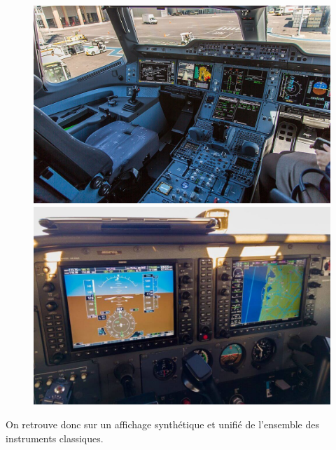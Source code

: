 	\begin{figure}[H]
	\begin{minipage}[c]{0.5\linewidth}
	\includegraphics[width=\linewidth]{01-EtudeAeronefs/img/A350Cockpit.jpg}
	\end{minipage}
	\hfill
	\begin{minipage}[c]{0.5\linewidth}
	\includegraphics[width=\linewidth]{01-EtudeAeronefs/img/C172glassCockpit.jpg}
	\end{minipage}
	\end{figure}
	
	On retrouve donc sur un affichage synthétique et unifié de l'ensemble des instruments classiques.
	
